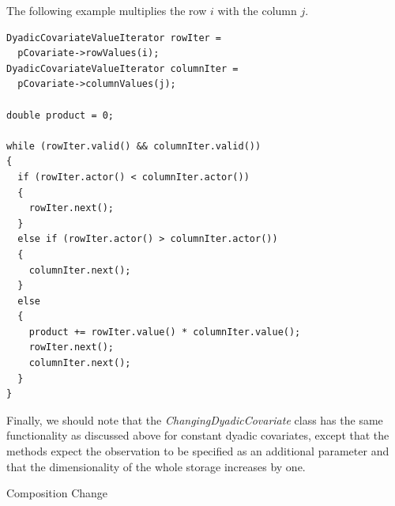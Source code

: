 \documentclass[12pt]{article}
\makeatletter
\renewcommand{\=}{\,=\,}
\newcommand{\+}{\,+\,}
\newcommand{\nnm}[1]{\textsf{\small\textit{#1}}}
\renewcommand{\subsection}{\@startsection{subsection}{2}
                {0pt}{0.7\baselineskip}{0.3\baselineskip}
                {\sffamily} }
\makeatother
\begin{document}
The following example multiplies the row $i$ with the column $j$.
\begin{verbatim}
DyadicCovariateValueIterator rowIter =
  pCovariate->rowValues(i);
DyadicCovariateValueIterator columnIter =
  pCovariate->columnValues(j);

double product = 0;

while (rowIter.valid() && columnIter.valid())
{
  if (rowIter.actor() < columnIter.actor())
  {
    rowIter.next();
  }
  else if (rowIter.actor() > columnIter.actor())
  {
    columnIter.next();
  }
  else
  {
    product += rowIter.value() * columnIter.value();
    rowIter.next();
    columnIter.next();
  }
}
\end{verbatim}

Finally, we should note that the \nnm{ChangingDyadicCovariate} class has the
same functionality as discussed above for constant dyadic covariates, except
that the methods expect the observation to be specified as an additional
parameter and that the dimensionality of the whole storage increases by one.

\subsection{Composition Change}
\end{document}
